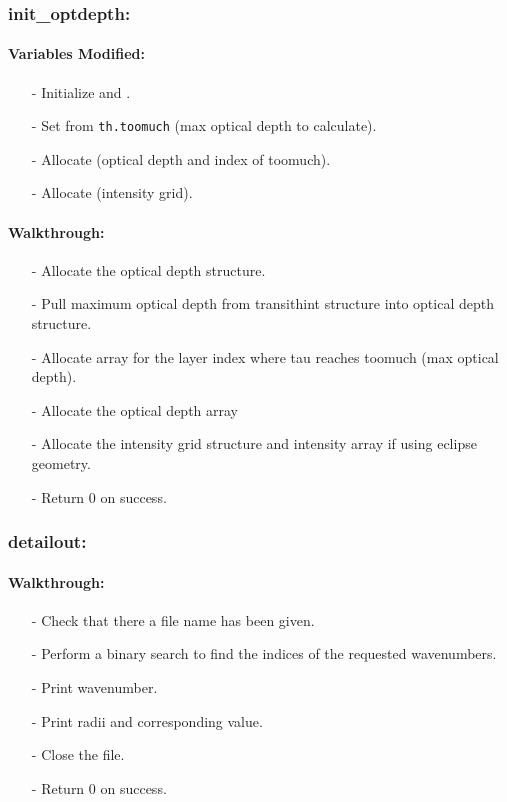 \documentclass[letterpaper,12pt]{article}
\begin{document}
\subsubsection{init\_optdepth:}
\paragraph{Variables Modified:}
\begin{enumerate}[leftmargin=10pt, noitemsep, parsep=0pt, topsep=0ex]
\item[-] Initialize  and .
\item[-] Set  from {\tt th.toomuch} (max
  optical depth to calculate).
\item[-] Allocate  (optical depth and
  index of toomuch).
\item[-] Allocate  (intensity grid).
\end{enumerate}

\paragraph{Walkthrough:}
\begin{enumerate}[leftmargin=10pt, noitemsep, parsep=0pt, topsep=0ex]
\item[-] Allocate the optical depth structure.
\item[-] Pull maximum optical depth from transithint structure into optical depth structure.
\item[-] Allocate array for the layer index where tau reaches toomuch (max optical depth).
\item[-] Allocate the optical depth array
\item[-] Allocate the intensity grid structure and intensity array if using eclipse geometry.
\item[-] Return 0 on success.
\end{enumerate}

\subsubsection{detailout:}
\paragraph{Walkthrough:}
\begin{enumerate}[leftmargin=10pt, noitemsep, parsep=0pt, topsep=0ex]
\item[-] Check that there a file name has been given.
\item[-] Perform a binary search to find the indices of the requested wavenumbers.
\item[-] Print wavenumber.
\item[-] Print radii and corresponding value.
\item[-] Close the file.
\item[-] Return 0 on success.
\end{enumerate}
\end{document}
